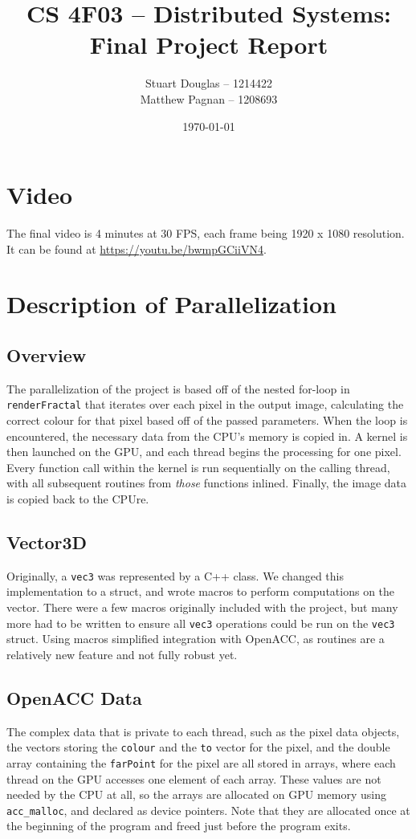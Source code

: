 \documentclass[11pt]{article}
\title{
\LARGE CS 4F03 -- Distributed Systems:
\\\vspace{10mm}
\large \textbf{Final Project Report}
\vspace{40mm}
}
\author{
Stuart Douglas -- 1214422
\\Matthew Pagnan -- 1208693
\vspace{10mm}
}
\date{\vfill \today}
\begin{document}
\maketitle
\newpage
\tableofcontents
\newpage

\section*{Video}
The final video is 4 minutes at 30 FPS, each frame being 1920 x 1080 resolution. It can be found at \url{https://youtu.be/bwmpGCiiVN4}.

\section{Description of Parallelization}
\subsection{Overview}
The parallelization of the project is based off of the nested for-loop in \texttt{renderFractal} that iterates over each pixel in the output image, calculating the correct colour for that pixel based off of the passed parameters. When the loop is encountered, the necessary data from the CPU's memory is copied in. A kernel is then launched on the GPU, and each thread begins the processing for one pixel. Every function call within the kernel is run sequentially on the calling thread, with all subsequent routines from \emph{those} functions inlined. Finally, the image data is copied back to the CPUre.

\subsection{Vector3D}
Originally, a \texttt{vec3} was represented by a C++ class. We changed this implementation to a struct, and wrote macros to perform computations on the vector. There were a few macros originally included with the project, but many more had to be written to ensure all \texttt{vec3} operations could be run on the \texttt{vec3} struct. Using macros simplified integration with OpenACC, as routines are a relatively new feature and not fully robust yet.

\subsection{OpenACC Data}
The complex data that is private to each thread, such as the pixel data objects, the vectors storing the \texttt{colour} and the \texttt{to} vector for the pixel, and the double array containing the \texttt{farPoint} for the pixel are all stored in arrays, where each thread on the GPU accesses one element of each array. These values are not needed by the CPU at all, so the arrays are allocated on GPU memory using \texttt{acc\_malloc}, and declared as device pointers. Note that they are allocated once at the beginning of the program and freed just before the program exits.
\end{document}

